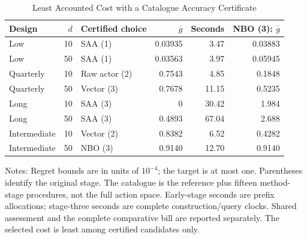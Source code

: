 \begin{table}[htbp]\centering
\caption{Least Accounted Cost with a Catalogue Accuracy Certificate}\label{tab:r18catalogue}
\small\setlength{\tabcolsep}{4pt}
\begin{tabular}{lrlrrr}\toprule
Design & $d$ & Certified choice & $\overline g$ & Seconds & NBO (3): $\overline g$\\\midrule
Low & 10 & SAA (1) & 0.03935 & 3.47 & 0.03883\\
Low & 50 & SAA (1) & 0.03563 & 3.97 & 0.05945\\
Quarterly & 10 & Raw actor (2) & 0.7543 & 4.85 & 0.1848\\
Quarterly & 50 & Vector (3) & 0.7678 & 11.15 & 0.5235\\
Long & 10 & SAA (3) & 0 & 30.42 & 1.984\\
Long & 50 & SAA (3) & 0.4893 & 67.04 & 2.688\\
Intermediate & 10 & Vector (2) & 0.8382 & 6.52 & 0.4282\\
Intermediate & 50 & NBO (3) & 0.9140 & 12.70 & 0.9140\\
\bottomrule\end{tabular}
\par\vspace{4pt}\begin{minipage}{.97\textwidth}\footnotesize
Notes: Regret bounds are in units of $10^{-4}$; the target is at most one. Parentheses identify the original stage. The catalogue is the reference plus fifteen method-stage procedures, not the full action space. Early-stage seconds are prefix allocations; stage-three seconds are complete construction/query clocks. Shared assessment and the complete comparative bill are reported separately. The selected cost is least among certified candidates only.
\end{minipage}\end{table}
